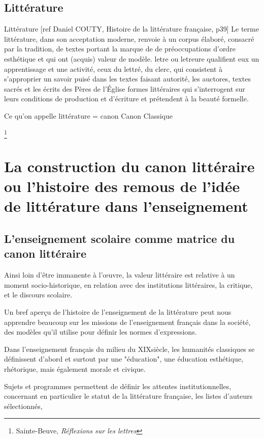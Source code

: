 \section{Littérature}

Littérature
[ref Daniel COUTY, Histoire de la littérature française, p39]
Le terme littérature, dans son acceptation moderne, renvoie à un corpus élaboré, consacré par la tradition, de textes portant la marque de de préoccupations d'ordre esthétique et qui ont (acquis) valeur de modèle. letre ou letreure qualifient eux un apprentissage et une activité, ceux du lettré, du clerc, qui consistent à s'approprier un savoir puisé dans les textes faisant autorité, les auctores, textes sacrés et les écrits des Pères de l'Église
formes littéraires qui s'interrogent sur leurs conditions de production et d'écriture et prétendent à la beauté formelle. 

Ce qu'on appelle littérature = canon
Canon 
Classique

\footnote{Sainte-Beuve, \textit{Réflexions sur les lettres}}

\chapter{La construction du canon littéraire ou l'histoire des remous de l'idée de littérature dans l'enseignement}

\section{L'enseignement scolaire comme matrice du canon littéraire}
Ainsi loin d’être immanente à l’œuvre, la valeur littéraire est relative à un moment socio-historique, en relation avec des institutions littéraires, la critique, et le discours scolaire.

Un bref aperçu de l'histoire de l'enseignement de la littérature peut nous apprendre beaucoup sur les missions de l'enseignement français dans la société, des modèles qu'il utilise pour définir les normes d'expressions.

Dans l'enseignement français du milieu du XIX\ieme siècle, les humanités classiques se définissent d'abord et surtout par une "éducation", une éducation esthétique, rhétorique, mais également morale et civique.

Sujets et programmes permettent de définir les attentes institutionnelles, concernant en particulier le statut de la littérature française, les listes d’auteurs sélectionnés, 

